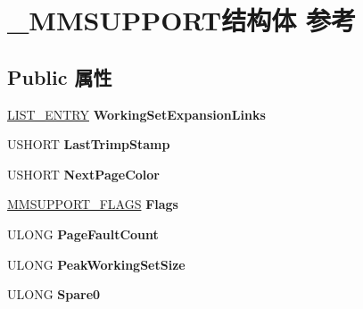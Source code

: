 \hypertarget{struct___m_m_s_u_p_p_o_r_t}{}\section{\+\_\+\+M\+M\+S\+U\+P\+P\+O\+R\+T结构体 参考}
\label{struct___m_m_s_u_p_p_o_r_t}
\subsection*{Public 属性}
\begin{DoxyCompactItemize}
\item 
\mbox{\label{struct___m_m_s_u_p_p_o_r_t_afaa358302a8c9bb6e6ba35f5c74050c6}} 
\hyperlink{struct___l_i_s_t___e_n_t_r_y}{L\+I\+S\+T\+\_\+\+E\+N\+T\+RY} {\bfseries Working\+Set\+Expansion\+Links}
\item 
\mbox{\label{struct___m_m_s_u_p_p_o_r_t_af753f0341f618951bad418592d71a74c}} 
U\+S\+H\+O\+RT {\bfseries Last\+Trimp\+Stamp}
\item 
\mbox{\label{struct___m_m_s_u_p_p_o_r_t_a9332c5cd1e7c444380debe1177ff58a0}} 
U\+S\+H\+O\+RT {\bfseries Next\+Page\+Color}
\item 
\mbox{\label{struct___m_m_s_u_p_p_o_r_t_a7e3dd984a60e9f2162a8addd46d6e433}} 
\hyperlink{struct___m_m_s_u_p_p_o_r_t___f_l_a_g_s}{M\+M\+S\+U\+P\+P\+O\+R\+T\+\_\+\+F\+L\+A\+GS} {\bfseries Flags}
\item 
\mbox{\label{struct___m_m_s_u_p_p_o_r_t_a6a5c682da19226c89178004a83a28d61}} 
U\+L\+O\+NG {\bfseries Page\+Fault\+Count}
\item 
\mbox{\label{struct___m_m_s_u_p_p_o_r_t_a7dd9046f83fbef0ff0d67027f4b37a6f}} 
U\+L\+O\+NG {\bfseries Peak\+Working\+Set\+Size}
\item 
\mbox{\label{struct___m_m_s_u_p_p_o_r_t_a08e1ad3abbf75e7a33b3b94f05397cb6}} 
U\+L\+O\+NG {\bfseries Spare0}
\item 
\mbox{\label{struct___m_m_s_u_p_p_o_r_t_af61b04415554322f54587043057b092d}} 

\end{DoxyCompactItemize}
